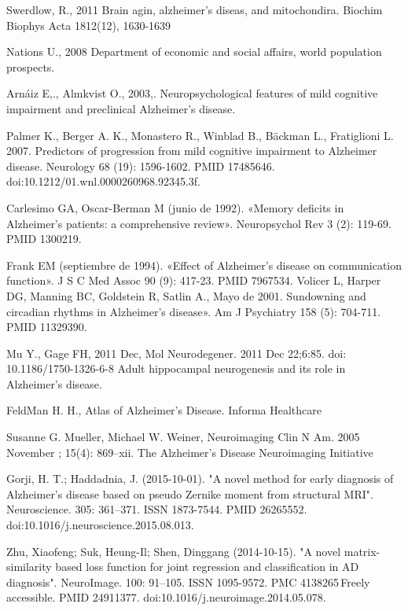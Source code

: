 \begin{thebibliography}{9}
	Swerdlow, R.,
	2011
	Brain agin, alzheimer's diseas, and mitochondira.
	Biochim Biophys Acta 1812(12), 1630-1639


	Nations U.,
	2008
	Department of economic and social affairs, world population prospects. 

	 Arnáiz E,., 
	 Almkvist O., 
	 2003,. 
	 Neuropsychological features of mild cognitive impairment and preclinical Alzheimer's disease. 



 	Palmer K., 
 	Berger A. K., 
 	Monastero R., 
 	Winblad B., 
 	Bäckman L., 
 	Fratiglioni L. 
 	2007. 
 	Predictors of progression from mild cognitive impairment to Alzheimer disease. 
 	Neurology 68 (19): 1596-1602. 
 	PMID 17485646. doi:10.1212/01.wnl.0000260968.92345.3f.

	 Carlesimo GA, Oscar-Berman M (junio de 1992). «Memory deficits in Alzheimer's patients: a comprehensive review». Neuropsychol Rev 3 (2): 119-69. PMID 1300219.

 	 Frank EM (septiembre de 1994). «Effect of Alzheimer's disease on communication function». J S C Med Assoc 90 (9): 417-23. PMID 7967534.
	Volicer L, 
	Harper DG, 
	Manning BC, 
	Goldstein R, 
	Satlin A., 
	Mayo de 2001. 
	Sundowning and circadian rhythms in Alzheimer's disease». Am J Psychiatry 158 (5): 704-711. PMID 11329390. 


	Mu Y., 
	Gage FH,
	2011 Dec,
Mol Neurodegener. 2011 Dec 22;6:85. doi: 10.1186/1750-1326-6-8
Adult hippocampal neurogenesis and its role in Alzheimer's disease.


	FeldMan H. H.,
	Atlas of Alzheimer's Disease.
	Informa Healthcare

	Susanne G. Mueller, 
	Michael W. Weiner, 
	Neuroimaging Clin N Am. 2005 November ; 15(4): 869–xii.
	The Alzheimer’s Disease Neuroimaging Initiative
	
\bibitem{}
 Gorji, H. T.; Haddadnia, J. (2015-10-01). "A novel method for early diagnosis of Alzheimer's disease based on pseudo Zernike moment from structural MRI". Neuroscience. 305: 361–371. ISSN 1873-7544. PMID 26265552. doi:10.1016/j.neuroscience.2015.08.013.

\bibitem{}
 Zhu, Xiaofeng; Suk, Heung-Il; Shen, Dinggang (2014-10-15). "A novel matrix-similarity based loss function for joint regression and classification in AD diagnosis". NeuroImage. 100: 91–105. ISSN 1095-9572. PMC 4138265 Freely accessible. PMID 24911377. doi:10.1016/j.neuroimage.2014.05.078.


\end{thebibliography}




\nocite{*}

\chapterend